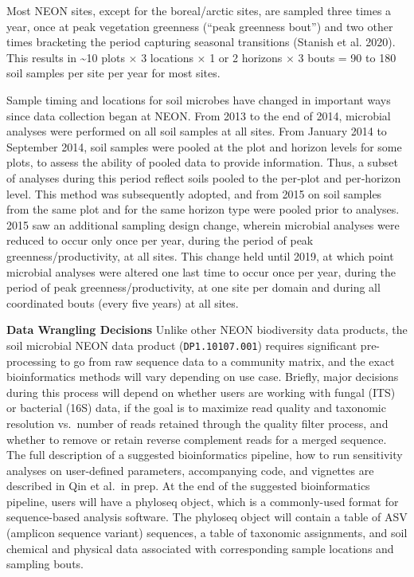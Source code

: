 \documentclass[
  12pt,
]{article}
\begin{document}
Most NEON sites, except for the boreal/arctic sites, are sampled three times a year, once at peak vegetation greenness (``peak greenness bout'') and two other times bracketing the period capturing seasonal transitions (Stanish et al. 2020). This results in \textasciitilde10 plots \(\times\) 3 locations \(\times\) 1 or 2 horizons \(\times\) 3 bouts = 90 to 180 soil samples per site per year for most sites.

Sample timing and locations for soil microbes have changed in important ways since data collection began at NEON. From 2013 to the end of 2014, microbial analyses were performed on all soil samples at all sites. From January 2014 to September 2014, soil samples were pooled at the plot and horizon levels for some plots, to assess the ability of pooled data to provide information. Thus, a subset of analyses during this period reflect soils pooled to the per‐plot and per‐horizon level. This method was subsequently adopted, and from 2015 on soil samples from the same plot and for the same horizon type were pooled prior to analyses. 2015 saw an additional sampling design change, wherein microbial analyses were reduced to occur only once per year, during the period of peak greenness/productivity, at all sites. This change held until 2019, at which point microbial analyses were altered one last time to occur once per year, during the period of peak greenness/productivity, at one site per domain and during all coordinated bouts (every five years) at all sites.

\textbf{Data Wrangling Decisions} Unlike other NEON biodiversity data products, the soil microbial NEON data product (\texttt{DP1.10107.001}) requires significant pre-processing to go from raw sequence data to a community matrix, and the exact bioinformatics methods will vary depending on use case. Briefly, major decisions during this process will depend on whether users are working with fungal (ITS) or bacterial (16S) data, if the goal is to maximize read quality and taxonomic resolution vs.~number of reads retained through the quality filter process, and whether to remove or retain reverse complement reads for a merged sequence. The full description of a suggested bioinformatics pipeline, how to run sensitivity analyses on user-defined parameters, accompanying code, and vignettes are described in Qin et al.~in prep. At the end of the suggested bioinformatics pipeline, users will have a phyloseq object, which is a commonly-used format for sequence-based analysis software. The phyloseq object will contain a table of ASV (amplicon sequence variant) sequences, a table of taxonomic assignments, and soil chemical and physical data associated with corresponding sample locations and sampling bouts.
\end{document}
